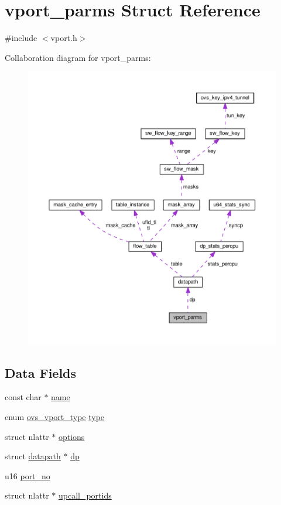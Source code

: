\hypertarget{structvport__parms}{}\section{vport\+\_\+parms Struct Reference}
\label{structvport__parms}


{\ttfamily \#include $<$vport.\+h$>$}



Collaboration diagram for vport\+\_\+parms\+:
\nopagebreak
\begin{figure}[H]
\begin{center}
\leavevmode
\includegraphics[width=350pt]{structvport__parms__coll__graph}
\end{center}
\end{figure}
\subsection*{Data Fields}
\begin{DoxyCompactItemize}
\item 
const char $\ast$ \hyperlink{structvport__parms_a4f27e2a7b7dc0493c095cdaabe225b38}{name}
\item 
enum \hyperlink{openvswitch_8h_a9a1b861aa99bd83177a2b10b34745b0a}{ovs\+\_\+vport\+\_\+type} \hyperlink{structvport__parms_ad79f91d20a33ff64cd72cad0b83ffae3}{type}
\item 
struct nlattr $\ast$ \hyperlink{structvport__parms_a5c6027e758731e1a16968e77d4e2ca7c}{options}
\item 
struct \hyperlink{structdatapath}{datapath} $\ast$ \hyperlink{structvport__parms_a15faa866e3d35a721de77b347017499e}{dp}
\item 
u16 \hyperlink{structvport__parms_a5bc77ace899b9bbdb6d7f833b31c009a}{port\+\_\+no}
\item 
struct nlattr $\ast$ \hyperlink{structvport__parms_ae9dbd12fddc1869a17229cef771a4d29}{upcall\+\_\+portids}
\end{DoxyCompactItemize}


